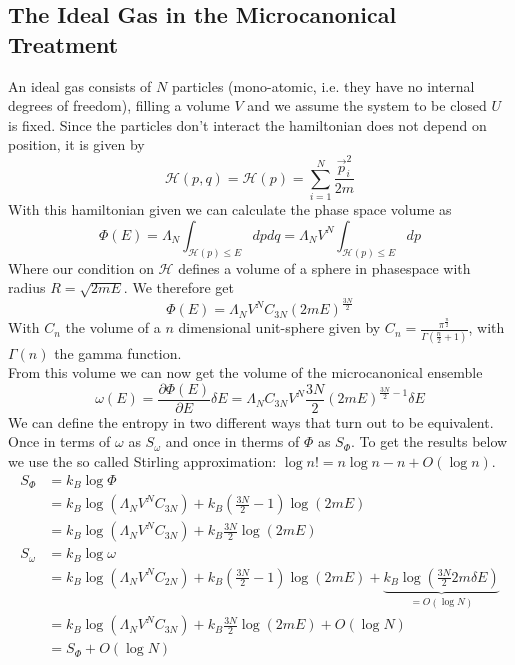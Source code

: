 \documentclass{report}
\begin{document}
\subsection{The Ideal Gas in the Microcanonical Treatment}
An ideal gas consists of $N$ particles (mono-atomic, i.e. they have no internal degrees of freedom), filling a volume $V$ and we assume the system to be closed $U$ is fixed. Since the particles don't interact the hamiltonian does not depend on position, it is given by \[
  \mathcal{H}\left( p,q \right) = \mathcal{H}\left( p \right) = \sum_{i=1}^{N} \frac{\vec{p}_i^2}{2m}
\] 
With this hamiltonian given we can calculate the phase space volume as \[
  \Phi\left( E \right) = \Lambda_N \int_{\mathcal{H}\left( p \right) \le E} dp dq = \Lambda_N V^N \int_{\mathcal{H}\left( p \right) \le E} dp
\] Where our condition on $\mathcal{H}$ defines a volume of a sphere in phasespace with radius $R = \sqrt{2m E} $. We therefore get \[
\Phi\left( E \right) = \Lambda_N V^N C_{3N}\left( 2mE \right) ^{\frac{3N}{2}}
\] With $C_{n} $ the volume of a $n$ dimensional unit-sphere given by $C_n = \frac{\pi^{\frac{n}{2}}}{\Gamma\left( \frac{n}{2} + 1 \right) }$, with $\Gamma\left( n \right) $ the gamma function.\\
From this volume we can now get the volume of the microcanonical ensemble \[
  \omega\left( E \right) = \frac{\partial \Phi\left( E \right)  }{\partial E } \delta E = \Lambda_N C_{3N} V^N \frac{3N}{2} \left( 2m E \right)^{\frac{3N}{2} - 1} \delta E
\] 
  We can define the entropy in two different ways that turn out to be equivalent. Once in terms of $\omega$ as $S_{\omega}$ and once in therms of $\Phi$ as $S_{\Phi}$.
  To get the results below we use the so called Stirling approximation: $\log n! = n \log n - n + O\left( \log n \right)$.
\begin{align*}
  S_{\Phi} &= k_B \log \Phi \\
           &= k_B \log\left( \Lambda_N V^N C_{3N} \right) + k_B \left( \frac{3N}{2} - 1 \right) \log\left( 2mE \right)  \\
           &= k_B \log\left( \Lambda_N V^N C_{3N} \right) + k_B \frac{3N}{2} \log\left( 2mE \right)  \\
  S_{\omega} &= k_B \log \omega \\
             &= k_B \log\left( \Lambda_N V^N C_{2N} \right) + k_B \left( \frac{3N}{2} - 1 \right) \log\left( 2mE \right) + \underbrace{k_B \log\left( \frac{3N}{2}2m \delta E \right)}_{=O\left( \log N \right) }  \\
             &= k_B \log\left( \Lambda_N V^N C_{3N} \right) + k_B \frac{3N}{2} \log\left( 2m E \right) + O\left( \log N \right)  \\
             &= S_{\Phi} + O\left( \log N \right)  \\
\end{align*}
\end{document}
